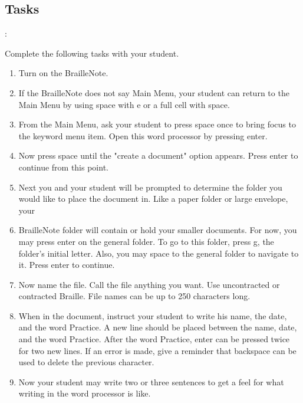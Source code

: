 \documentclass[10pt,letterpaper,twoside]{report}
\begin{document}
{{{{ \subsection{Tasks}:



Complete the following tasks with your student.



\begin{enumerate}
	\item Turn on the BrailleNote.
	      
	\item If the BrailleNote does not say Main Menu, your student can return to the Main Menu by using space with e or a full cell with space.
	      
	\item From the Main Menu, ask your student to press space once to bring focus to the keyword menu item.  Open this word processor by pressing enter.
	      
	\item Now press space until the "create a document" option appears.  Press enter to continue from this point.
	      
	\item Next you and your student will be prompted to determine the folder you would like to place the document in.  Like a paper folder or large envelope, your
	      
	\item BrailleNote folder will contain or hold your smaller documents.  For now, you may press enter on the general folder.  To go to this folder, press g, the folder's initial letter.  Also, you may space to the general folder to navigate to it.  Press enter to continue.
	      
	\item Now name the file.  Call the file anything you want.  Use uncontracted or contracted Braille.  File names can be up to 250 characters long.
	      
	\item When in the document, instruct your student to write his name, the date, and the word Practice.  A new line should be placed between the name, date, and the word Practice.  After the word Practice, enter can be pressed twice for two new lines.  If an error is made, give a reminder that backspace can be used to delete the previous character.
	      
	\item Now your student may write two or three sentences to get a feel for what writing in the word processor is like.
	      

\end{enumerate}}}}}
\end{document}
